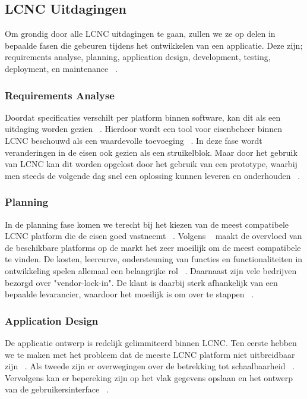 \subsection*{LCNC Uitdagingen}
\label{sub:lcnc-uitdagingen}
Om grondig door alle LCNC uitdagingen te gaan, zullen we ze op delen in bepaalde fasen
die gebeuren tijdens het ontwikkelen van een applicatie. 
Deze zijn; requirements analyse, planning, application design, development, testing, deployment, en maintenance ~\autocite{Rokis_2022}.
\subsubsection*{Requirements Analyse}
\label{sub:requirements-analyse}
Doordat specificaties verschilt per platform binnen software, kan dit als een uitdaging worden gezien ~\autocite{Rokis_2022}.
Hierdoor wordt een tool voor eisenbeheer binnen LCNC beschouwd als een waardevolle toevoeging ~\autocite{Rokis_2022}. 
In deze fase wordt veranderingen in de eisen ook gezien als een struikelblok. Maar door het gebruik van LCNC kan dit worden opgelost 
door het gebruik van een prototype, waarbij men steeds de volgende dag snel een oplossing kunnen leveren en onderhouden ~\autocite{Rokis_2022}.
\subsubsection*{Planning}
\label{sub:planning}
In de planning fase komen we terecht bij het kiezen van de meest compatibele LCNC platform die de eisen goed vastneemt ~\autocite{Rokis_2022}.
Volgens ~\textcite{Rokis_2022} maakt de overvloed van de beschikbare platforms op de markt het zeer moeilijk om de meest compatibele te vinden. De 
kosten, leercurve, ondersteuning van functies en functionaliteiten in ontwikkeling spelen allemaal een belangrijke rol ~\autocite{Rokis_2022}. Daarnaast zijn vele
bedrijven bezorgd over "vendor-lock-in". De klant is daarbij sterk afhankelijk van een bepaalde levarancier, waardoor het moeilijk is om over te stappen ~\autocite{Rokis_2022}.
\subsubsection*{Application Design}
\label{sub:application-design}
De applicatie ontwerp is redelijk gelimmiteerd binnen LCNC.
Ten eerste hebben we te maken met het probleem dat de meeste LCNC platform niet uitbreidbaar zijn ~\autocite{Rokis_2022}.
Als tweede zijn er overwegingen over de betrekking tot schaalbaarheid ~\autocite{Rokis_2022}. 
Vervolgens kan er bepereking zijn op het vlak gegevens opslaan en het ontwerp van de gebruikersinterface ~\autocite{Rokis_2022}.
